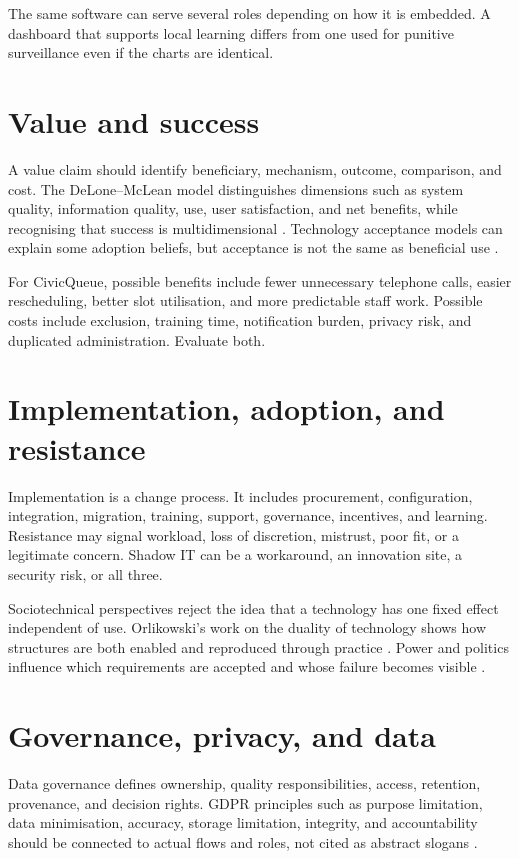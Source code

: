 The same software can serve several roles depending on how it is embedded. A dashboard that supports local learning differs from one used for punitive surveillance even if the charts are identical.

\section{Value and success}
A value claim should identify beneficiary, mechanism, outcome, comparison, and cost. The DeLone--McLean model distinguishes dimensions such as system quality, information quality, use, user satisfaction, and net benefits, while recognising that success is multidimensional \citep{delone1992success}. Technology acceptance models can explain some adoption beliefs, but acceptance is not the same as beneficial use \citep{davis1989usefulness,venkatesh2003user}.

For CivicQueue, possible benefits include fewer unnecessary telephone calls, easier rescheduling, better slot utilisation, and more predictable staff work. Possible costs include exclusion, training time, notification burden, privacy risk, and duplicated administration. Evaluate both.

\section{Implementation, adoption, and resistance}
Implementation is a change process. It includes procurement, configuration, integration, migration, training, support, governance, incentives, and learning. Resistance may signal workload, loss of discretion, mistrust, poor fit, or a legitimate concern. Shadow IT can be a workaround, an innovation site, a security risk, or all three.

Sociotechnical perspectives reject the idea that a technology has one fixed effect independent of use. Orlikowski's work on the duality of technology shows how structures are both enabled and reproduced through practice \citep{orlikowski1992duality}. Power and politics influence which requirements are accepted and whose failure becomes visible \citep{markus1983power}.

\section{Governance, privacy, and data}
Data governance defines ownership, quality responsibilities, access, retention, provenance, and decision rights. GDPR principles such as purpose limitation, data minimisation, accuracy, storage limitation, integrity, and accountability should be connected to actual flows and roles, not cited as abstract slogans \citep{gdpr2016}.

